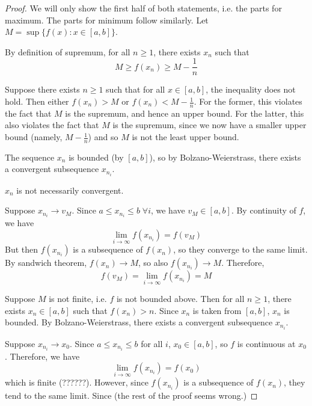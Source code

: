 \begin{proof}
  We will only show the first half of both statements, i.e. the parts for maximum. The parts for minimum follow similarly. Let $M = \sup\{f(x) : x \in [a, b]\}$. 
  
  By definition of supremum, for all $n \geq 1$, there exists $x_n$ such that
  \[
    M \geq f(x_n) \geq M - \frac{1}{n}
  \]
  \begin{remark}
    Suppose there exists $n \geq 1$ such that for all $x \in [a, b]$, the inequality does not hold. Then either $f(x_n) > M$ or $f(x_n) < M - \frac{1}{n}$. For the former, this violates the fact that $M$ is the supremum, and hence an upper bound. For the latter, this also violates the fact that $M$ is the supremum, since we now have a smaller upper bound (namely, $M - \frac{1}{n}$) and so $M$ is not the least upper bound.
  \end{remark}
  The sequence $x_n$ is bounded (by $[a, b]$), so by Bolzano-Weierstrass, there exists a convergent subsequence $x_{n_i}$.
  \begin{remark}
    $x_n$ is not necessarily convergent.
  \end{remark}
  Suppose $x_{n_i} \to v_M$. Since $a \leq x_{n_i} \leq b \; \forall i$, we have $v_M \in [a, b]$. By continuity of $f$, we have
  \[
    \lim_{i \to \infty} f(x_{n_i}) = f(v_M)
  \]
  But then $f(x_{n_i})$ is a subsequence of $f(x_n)$, so they converge to the same limit. By sandwich theorem, $f(x_n) \to M$, so also $f(x_{n_i}) \to M$. Therefore,
  \[
    f(v_M) = \lim_{i \to \infty} f(x_{n_i}) = M
  \]

  Suppose $M$ is not finite, i.e. $f$ is not bounded above. Then for all $n \geq 1$, there exists $x_n \in [a, b]$ such that $f(x_n) > n$. Since $x_n$ is taken from $[a, b]$, $x_n$ is bounded. By Bolzano-Weierstrass, there exists a convergent subsequence $x_{n_i}$. 
  
  Suppose $x_{n_i} \to x_0$. Since $a \leq x_{n_i} \leq b$ for all $i$, $x_0 \in [a, b]$, so $f$ is continuous at $x_0$. Therefore, we have
  \[
    \lim_{i \to \infty} f(x_{n_i}) = f(x_0)
  \] 
  which is finite (??????). However, since $f(x_{n_i})$ is a subsequence of $f(x_n)$, they tend to the same limit. Since (the rest of the proof seems wrong.)
\end{proof}


